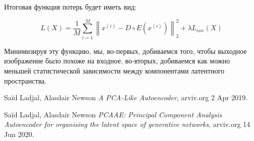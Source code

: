 Итоговая функция потерь будет иметь вид:

$$L(X) = \frac{1}{M} \sum_{i=1}^{M} \left\| x^{(i)} - D \circ E(x^{(i)}) \right\|_2^2 + \lambda L_{\text{cov}}(X)
$$

Минимизируя эту функцию, мы, во-первых, добиваемся того, чтобы выходное изображение было похоже на входное, во-вторых, добиваемся как можно меньшей статистической зависимости между компонентами латентного пространства.

\begin{thebibliography}{99}


     Saïd Ladjal, Alasdair Newson \textit{A PCA-Like Autoencoder}, arviv.org  2 Apr 2019.

     Saïd Ladjal, Alasdair Newson \textit{PCAAE: Principal Component Analysis Autoencoder for organising the latent space of generative networks}, arviv.org 14 Jun 2020.

\end{thebibliography}

